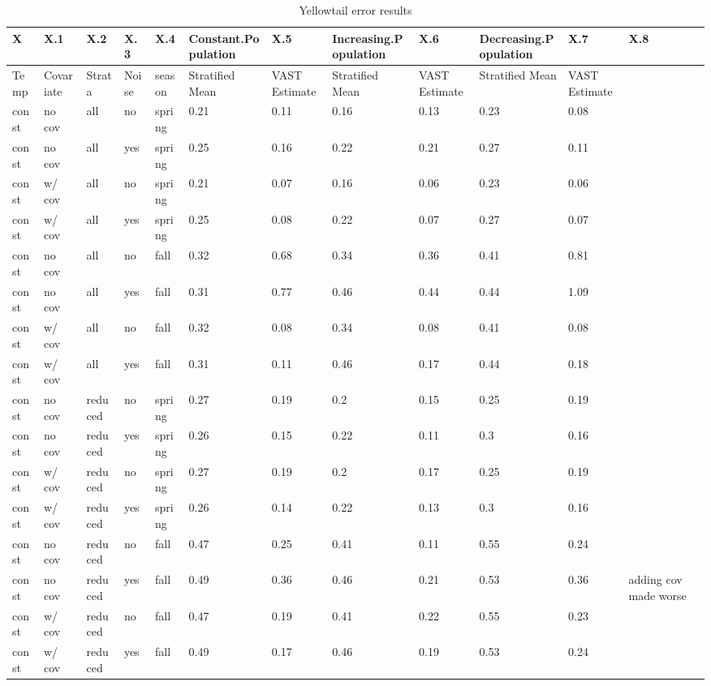 \documentclass[
]{article}
\begin{document}
\begin{table}

\caption{\label{tab:unnamed-chunk-1}Yellowtail error results}
\centering
\begin{tabular}[t]{l|l|l|l|l|l|l|l|l|l|l|l}
\hline
X & X.1 & X.2 & X.3 & X.4 & Constant.Population & X.5 & Increasing.Population & X.6 & Decreasing.Population & X.7 & X.8\\
\hline
Temp & Covariate & Strata & Noise & season & Stratified Mean & VAST Estimate & Stratified Mean & VAST Estimate & Stratified Mean & VAST Estimate & \\
\hline
const & no cov & all & no & spring & 0.21 & 0.11 & 0.16 & 0.13 & 0.23 & 0.08 & \\
\hline
const & no cov & all & yes & spring & 0.25 & 0.16 & 0.22 & 0.21 & 0.27 & 0.11 & \\
\hline
const & w/ cov & all & no & spring & 0.21 & 0.07 & 0.16 & 0.06 & 0.23 & 0.06 & \\
\hline
const & w/ cov & all & yes & spring & 0.25 & 0.08 & 0.22 & 0.07 & 0.27 & 0.07 & \\
\hline
const & no cov & all & no & fall & 0.32 & 0.68 & 0.34 & 0.36 & 0.41 & 0.81 & \\
\hline
const & no cov & all & yes & fall & 0.31 & 0.77 & 0.46 & 0.44 & 0.44 & 1.09 & \\
\hline
const & w/ cov & all & no & fall & 0.32 & 0.08 & 0.34 & 0.08 & 0.41 & 0.08 & \\
\hline
const & w/ cov & all & yes & fall & 0.31 & 0.11 & 0.46 & 0.17 & 0.44 & 0.18 & \\
\hline
const & no cov & reduced & no & spring & 0.27 & 0.19 & 0.2 & 0.15 & 0.25 & 0.19 & \\
\hline
const & no cov & reduced & yes & spring & 0.26 & 0.15 & 0.22 & 0.11 & 0.3 & 0.16 & \\
\hline
const & w/ cov & reduced & no & spring & 0.27 & 0.19 & 0.2 & 0.17 & 0.25 & 0.19 & \\
\hline
const & w/ cov & reduced & yes & spring & 0.26 & 0.14 & 0.22 & 0.13 & 0.3 & 0.16 & \\
\hline
const & no cov & reduced & no & fall & 0.47 & 0.25 & 0.41 & 0.11 & 0.55 & 0.24 & \\
\hline
const & no cov & reduced & yes & fall & 0.49 & 0.36 & 0.46 & 0.21 & 0.53 & 0.36 & adding cov made worse\\
\hline
const & w/ cov & reduced & no & fall & 0.47 & 0.19 & 0.41 & 0.22 & 0.55 & 0.23 & \\
\hline
const & w/ cov & reduced & yes & fall & 0.49 & 0.17 & 0.46 & 0.19 & 0.53 & 0.24 & \\

\end{tabular}
\end{table}
\end{document}
